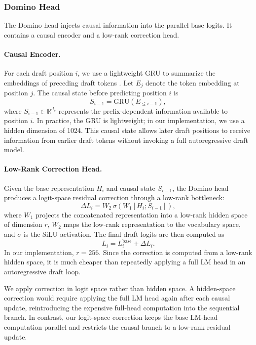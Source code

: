 \subsubsection{Domino Head}

The Domino head injects causal information into the parallel base logits. It contains a causal encoder and a low-rank correction head.

\paragraph{Causal Encoder.}
For each draft position \(i\), we use a lightweight GRU to summarize the embeddings of preceding draft tokens \citep{cho2014learning}. Let \(E_j\) denote the token embedding at position \(j\). The causal state before predicting position \(i\) is
\[
S_{i-1} = \mathrm{GRU}(E_{\le i-1}),
\]
where \(S_{i-1} \in \mathbb{R}^{d_s}\) represents the prefix-dependent information available to position \(i\). In practice, the GRU is lightweight; in our implementation, we use a hidden dimension of 1024. This causal state allows later draft positions to receive information from earlier draft tokens without invoking a full autoregressive draft model.

\paragraph{Low-Rank Correction Head.}
Given the base representation \(H_i\) and causal state \(S_{i-1}\), the Domino head produces a logit-space residual correction through a low-rank bottleneck:
\[
\Delta L_i
=
W_2 \, \sigma\!\left(W_1 [H_i; S_{i-1}]\right),
\]
where \(W_1\) projects the concatenated representation into a low-rank hidden space of dimension \(r\), \(W_2\) maps the low-rank representation to the vocabulary space, and \(\sigma\) is the SiLU activation. The final draft logits are then computed as
\[
L_i = L_i^{\mathrm{base}} + \Delta L_i.
\]
In our implementation, \(r=256\). Since the correction is computed from a low-rank hidden space, it is much cheaper than repeatedly applying a full LM head in an autoregressive draft loop.

We apply correction in logit space rather than hidden space. A hidden-space correction would require applying the full LM head again after each causal update, reintroducing the expensive full-head computation into the sequential branch. In contrast, our logit-space correction keeps the base LM-head computation parallel and restricts the causal branch to a low-rank residual update.

